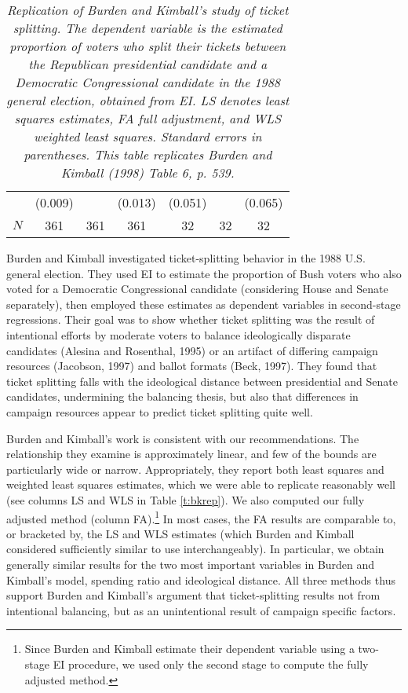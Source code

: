 \documentclass[11pt,titlepage]{article}
\begin{document}
\begin{table}[th]
\begin{center}
\begin{tabular}{lcccccc}
        &       (0.009) &               &       (0.013) &       (0.051) &               &       (0.065) \\
$N$     &       361     &       361     &       361     &       32      &       32      &       32      \\
\hline
\end{tabular}
\end{center}
\caption{\em Replication of Burden and Kimball's study of ticket
  splitting.  The dependent variable is the estimated proportion of 
voters who split their tickets between the Republican presidential 
candidate and a Democratic Congressional candidate in the 1988 general 
election, obtained from EI.  LS denotes least squares estimates, FA 
full adjustment, and WLS weighted least squares.  Standard errors in 
parentheses.  This table replicates Burden and Kimball (1998) Table 
6, p. 539.}
\end{table}

Burden and Kimball investigated ticket-splitting behavior in the 1988
U.S. general election.  They used EI to estimate the proportion of
Bush voters who also voted for a Democratic Congressional candidate
(considering House and Senate separately), then employed these
estimates as dependent variables in second-stage regressions.  Their
goal was to show whether ticket splitting was the result of
intentional efforts by moderate voters to balance ideologically
disparate candidates (Alesina and Rosenthal, 1995) or an artifact of
differing campaign resources (Jacobson, 1997) and ballot formats
(Beck, 1997).  They found that ticket splitting falls with the
ideological distance between presidential and Senate candidates,
undermining the balancing thesis, but also that differences in
campaign resources appear to predict ticket splitting quite well.

Burden and Kimball's work is consistent with our recommendations.  The
relationship they examine is approximately linear, and few of the
bounds are particularly wide or narrow.  Appropriately, they report
both least squares and weighted least squares estimates, which we were
able to replicate reasonably well (see columns LS and WLS in Table
\ref{t:bkrep}).  We also computed our fully adjusted method (column
FA).\footnote{Since Burden and Kimball estimate their dependent
  variable using a two-stage EI procedure, we used only the second
  stage to compute the fully adjusted method.} In most cases, the FA
results are comparable to, or bracketed by, the LS and WLS estimates
(which Burden and Kimball considered sufficiently similar to use
interchangeably).  In particular, we obtain generally similar results
for the two most important variables in Burden and Kimball's model,
spending ratio and ideological distance.  All three methods thus
support Burden and Kimball's argument that ticket-splitting results
not from intentional balancing, but as an unintentional result of
campaign specific factors.
\end{document}
